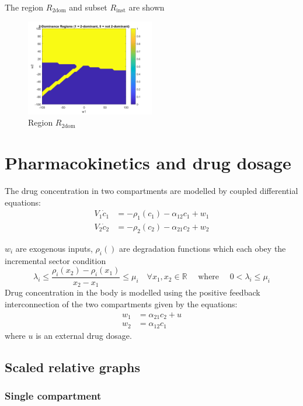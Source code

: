 \documentclass{article}
\begin{document}
The region $R_\text{2dom}$ and subset $R_\text{inst}$ are shown

\begin{figure}[H]
    \centering
    \includegraphics[width=0.5\textwidth]{figures/R2dom.png}
    \caption{Region $R_\text{2dom}$}
    \label{fig:R2dom}
\end{figure}

\section{Pharmacokinetics and drug dosage}

The drug concentration in two compartments are modelled by coupled differential equations:
\begin{align}
    V_1 \dot{c}_1 &= - \rho_1(c_1) - \alpha_{12}c_1 + w_1 \\
    V_2 \dot{c}_2 &= - \rho_2(c_2) - \alpha_{21}c_2 + w_2
\end{align}

$w_i$ are exogenous inputs, $\rho_i()$ are degradation functions which each obey the incremental sector condition
\begin{equation}
    \lambda_i \leq \frac{\rho_i(x_2) - \rho_i(x_1)}{x_2 - x_1} \leq \mu_i \quad \forall x_1, x_2 \in \mathbb{R} \quad \text{ where } \quad 0 < \lambda_i \leq \mu_i
\end{equation}
Drug concentration in the body is modelled using the positive feedback interconnection of the two compartments given by the equations:
\begin{align}
    w_1 &= \alpha_{21} c_2 + u \\
    w_2 &= \alpha_{12} c_1
\end{align}
where $u$ is an external drug dosage.
\subsection{Scaled relative graphs}

\subsubsection{Single compartment}
\end{document}
